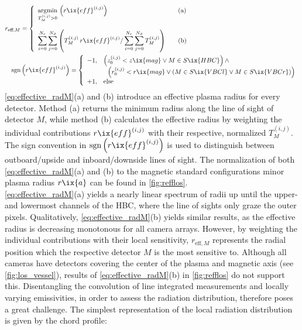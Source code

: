 %
                \begin{align}%
                    &r_{\text{eff}, M}=\left\{%
                    \begin{array}{ll}%
                        \underset{T^{\left(i,j\right)}_{M}>0}{\text{argmin}}\,\left(r\ix{eff}^{\left(i,j\right)}\right)&\quad\text{(a)}\\%
                        \,\\%
                        \displaystyle\sum_{i=0}^{N_{r}}\sum_{j=0}^{N_{\vartheta}}\left(T_{M}^{\left(i.j\right)}\,r\ix{eff}^{\left(i,j\right)}/\sum_{i=0}^{N_{r}}\sum_{j=0}^{N_{\vartheta}}T_{M}^{\left(i,j\right)}\right)&\quad\text{(b)}%
                    \end{array}\right.\label{eq:effective_radM}\\%
                    &\quad\text{sgn}\left(r\ix{eff}^{\left(i,j\right)}\right)=\left\{%
                    \begin{array}{ll}%
                        -1,&\left(z_{0}^{\left(i,j\right)}<z\ix{mag}\vee M\in S\ix{HBC}\right)\wedge\\%
                        &\,\,\,\,\left(r_{0}^{\left(i,j\right)}<r\ix{mag}\vee\left(M\in S\ix{VBCl}\vee M\in S\ix{VBCr}\right)\right)\\%
                        +1,&\text{else}%
                    \end{array}\right.\nonumber%
                \end{align}%
%
                \autoref{eq:effective_radM}(a) and (b) introduce an effective plasma radius for every detector. Method (a) returns the minimum radius along the line of sight of detector $M$, while method (b) calculates the effective radius by weighting the individual contributions $r\ix{eff}^{\left(i,j\right)}$ with their respective, normalized $T_{M}^{\left(i,j\right)}$. The sign convention in $\text{sgn}\left(r\ix{eff}^{\left(i,j\right)}\right)$ is used to distinguish between outboard/upside and inboard/downside lines of sight.%
                The normalization of both \cref{eq:effective_radM}(a) and (b) to the magnetic standard configurations minor plasma radius $r\ix{a}$ can be found in \cref{fig:refflos}.\\%
                \autoref{eq:effective_radM}(a) yields a nearly linear spectrum of radii up until the upper- and lowermost channels of the HBC, where the line of sights only graze the outer pixels. Qualitatively, \cref{eq:effective_radM}(b) yields similar results, as the effective radius is decreasing monotonous for all camera arrays. However, by weighting the individual contributions with their local sensitivity, $r_{\text{eff}, M}$ represents the radial position which the respective detector $M$ is the most sensitive to. Although all cameras have detectors covering the center of the plasma and magnetic axis (see \cref{fig:los_vessel}), results of \cref{eq:effective_radM}(b) in \cref{fig:refflos} do not support this. Disentangling the convolution of line integrated measurements and locally varying emissivities, in order to assess the radiation distribution, therefore poses a great challenge. The simplest representation of the local radiation distribution is given by the chord profile:%
